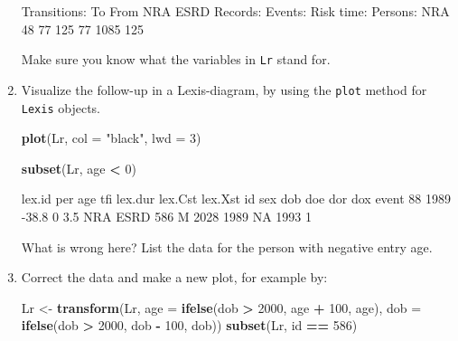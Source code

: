 \documentclass[
]{book}
\newenvironment{Shaded}{\begin{snugshade}}{\end{snugshade}}
\newcommand{\AttributeTok}[1]{\textcolor[rgb]{0.13,0.29,0.53}{#1}}
\newcommand{\DecValTok}[1]{\textcolor[rgb]{0.00,0.00,0.81}{#1}}
\newcommand{\FunctionTok}[1]{\textcolor[rgb]{0.13,0.29,0.53}{\textbf{#1}}}
\newcommand{\NormalTok}[1]{#1}
\newcommand{\OtherTok}[1]{\textcolor[rgb]{0.56,0.35,0.01}{#1}}
\newcommand{\SpecialCharTok}[1]{\textcolor[rgb]{0.81,0.36,0.00}{\textbf{#1}}}
\newcommand{\StringTok}[1]{\textcolor[rgb]{0.31,0.60,0.02}{#1}}
\begin{document}
\begin{enumerate}
\begin{Shaded}
\begin{Highlighting}[]
\NormalTok{Transitions:}
\NormalTok{     To}
\NormalTok{From  NRA ESRD  Records:  Events: Risk time:  Persons:}
\NormalTok{  NRA  48   77       125       77       1085       125}
\end{Highlighting}
\end{Shaded}

  Make sure you know what the variables in \texttt{Lr} stand for.
\item
  Visualize the follow-up in a Lexis-diagram, by using the
  \texttt{plot} method for \texttt{Lexis} objects.

\begin{Shaded}
\begin{Highlighting}[]
\FunctionTok{plot}\NormalTok{(Lr, }\AttributeTok{col =} \StringTok{"black"}\NormalTok{, }\AttributeTok{lwd =} \DecValTok{3}\NormalTok{)}
\end{Highlighting}
\end{Shaded}

\begin{Shaded}
\begin{Highlighting}[]
\FunctionTok{subset}\NormalTok{(Lr, age }\SpecialCharTok{\textless{}} \DecValTok{0}\NormalTok{)}
\end{Highlighting}
\end{Shaded}

\begin{Shaded}
\begin{Highlighting}[]
\NormalTok{ lex.id  per   age tfi lex.dur lex.Cst lex.Xst  id sex  dob  doe dor  dox event}
\NormalTok{     88 1989 {-}38.8   0     3.5     NRA    ESRD 586   M 2028 1989  NA 1993     1}
\end{Highlighting}
\end{Shaded}

  What is wrong here? List the data for the person with negative entry age.
\item
  Correct the data and make a new plot, for example by:

\begin{Shaded}
\begin{Highlighting}[]
\NormalTok{Lr }\OtherTok{\textless{}{-}} \FunctionTok{transform}\NormalTok{(Lr, }\AttributeTok{age =} \FunctionTok{ifelse}\NormalTok{(dob }\SpecialCharTok{\textgreater{}} \DecValTok{2000}\NormalTok{, age }\SpecialCharTok{+} \DecValTok{100}\NormalTok{, age),}
                    \AttributeTok{dob =} \FunctionTok{ifelse}\NormalTok{(dob }\SpecialCharTok{\textgreater{}} \DecValTok{2000}\NormalTok{, dob }\SpecialCharTok{{-}} \DecValTok{100}\NormalTok{, dob))}
\FunctionTok{subset}\NormalTok{(Lr, id }\SpecialCharTok{==} \DecValTok{586}\NormalTok{)}
\end{Highlighting}
\end{Shaded}


\end{enumerate}
\end{document}
